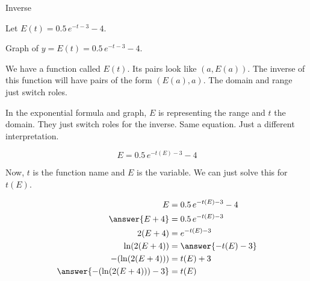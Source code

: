 \documentclass{ximera}
\begin{document}
\begin{example} Inverse

Let $E(t) = 0.5 \, e^{-t-3} - 4$.




Graph of $y = E(t) = 0.5 \, e^{-t-3} - 4$.


\begin{image}
\end{image}




We have a function called $E(t)$.  Its pairs look like $(a, E(a))$.  The inverse of this function will have pairs of the form $(E(a), a)$. The domain and range just switch roles.


In the exponential formula and graph, $E$ is representing the range and $t$ the domain.  They just switch roles for the inverse. Same equation.  Just a different interpretation.

\[    E = 0.5 \, e^{-t(E)-3} - 4   \]


Now, $t$ is the function name and $E$ is the variable.  We can just solve this for $t(E)$.

\begin{align*}
E           & = 0.5 \, e^{-t(E)-3} - 4 \\
\answer{E + 4}       & = 0.5 \, e^{-t(E)-3}  \\
2(E + 4)    & =  e^{-t(E)-3}   \\
\ln(2(E+4))  & = \answer{-t(E)-3}   \\
-(\ln(2(E+4)))  & = t(E)+3   \\
\answer{-(\ln(2(E+4))) - 3}   & = t(E)
\end{align*}








\end{example}
\end{document}
